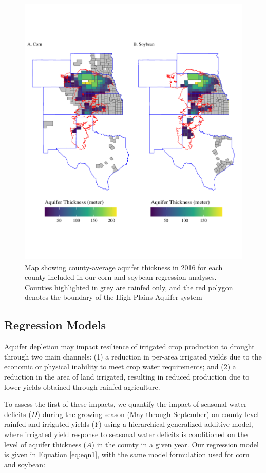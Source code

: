 \documentclass[
]{article}
\begin{document}
\begin{figure}[H]

{\centering \includegraphics[width=6in,height=500px,]{../../Figures/g_map} 

}

\caption{Map showing county-average aquifer thickness in 2016 for each county included in our corn and soybean regression analyses. Counties highlighted in grey are rainfed only, and the red polygon denotes the boundary of the High Plains Aquifer system}\label{fig:sat-map}
\end{figure}

\hypertarget{regression-models}{%
\subsection{Regression Models}\label{regression-models}}

Aquifer depletion may impact resilience of irrigated crop production to drought through two main channels: (1) a reduction in per-area irrigated yields due to the economic or physical inability to meet crop water requirements; and (2) a reduction in the area of land irrigated, resulting in reduced production due to lower yields obtained through rainfed agriculture.

To assess the first of these impacts, we quantify the impact of seasonal water deficits (\(D\)) during the growing season (May through September) on county-level rainfed and irrigated yields (\(Y\)) using a hierarchical generalized additive model, where irrigated yield response to seasonal water deficits is conditioned on the level of aquifer thickness (\(A\)) in the county in a given year. Our regression model is given in Equation \eqref{eq:eqn1}, with the same model formulation used for corn and soybean:
\end{document}
